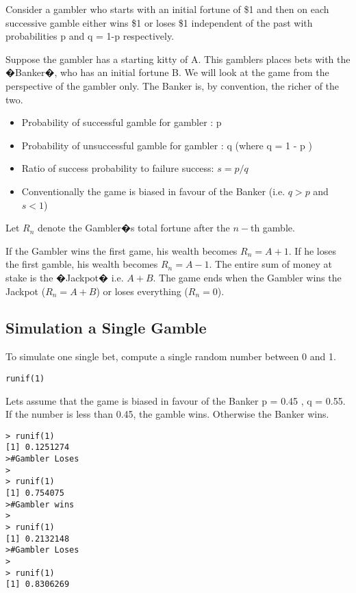 Consider a gambler who starts with an initial fortune of \$1 and then on each successive gamble
either wins \$1 or loses \$1 independent of the past with probabilities p and q = 1-p respectively.

Suppose the gambler has a starting kitty of A.
This gamblers places bets with the �Banker�, who has an initial fortune B. We will look at the game from the perspective of the gambler only.
The Banker is, by convention, the richer of the two.

\begin{itemize}
\item Probability of successful gamble for gambler : p
\item Probability of unsuccessful gamble for gambler : q 	(where q =  1 - p )
\item Ratio of success probability to failure success:	$s = p / q$
\item Conventionally the game is biased in favour of the Banker (i.e. $q>p$ and $s<1$)
\end{itemize}

Let $R_n$ denote the Gambler�s total fortune after the $n-$th gamble.

If the Gambler wins the first game, his wealth becomes $R_n =A+1$.
If he loses the first gamble, his wealth becomes $R_n = A-1$.
The entire sum of money at stake is the �Jackpot� i.e.   $A+B$.
The game ends when the Gambler wins the Jackpot ($R_n = A+B$) or loses everything ($R_n = 0$).


\subsection{Simulation a Single Gamble}


To simulate one single bet, compute a single random number between 0 and 1.
\begin{framed}
\begin{verbatim}
runif(1)
\end{verbatim}
\end{framed}

Lets assume that the game is biased in favour of the Banker
p = 0.45 , q = 0.55.
If the number is less than 0.45, the gamble wins. Otherwise the Banker wins.

\begin{verbatim}
> runif(1)
[1] 0.1251274
>#Gambler Loses
>
> runif(1)
[1] 0.754075
>#Gambler wins
>
> runif(1)
[1] 0.2132148
>#Gambler Loses
>
> runif(1)
[1] 0.8306269
\end{verbatim}

